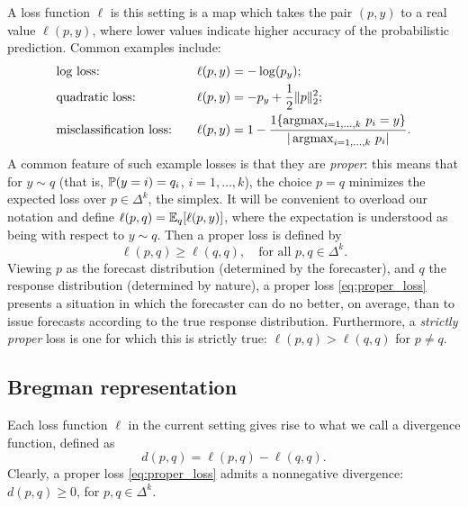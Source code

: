 A loss function $\ell$ is this setting is a map which takes the pair $(p,y)$ to
a real value $\ell(p,y)$, where lower values indicate higher accuracy of the 
probabilistic prediction. Common examples include: 
\begin{alignat*}{3}
&\text{log loss:} \quad &&\ell(p,y) = -\log(p_y); \\
&\text{quadratic loss:} \quad &&\ell(p,y) = -p_y + \frac{1}{2} \|p\|_2^2; \\
&\text{misclassification loss:} \quad &&\ell(p,y) = 1 - 
  \frac{1\{\argmax_{i=1,\dots,k} \, p_i = y \}}{|\argmax_{i=1,\dots,k} \, p_i|}.  
\end{alignat*}
A common feature of such example losses is that they are \emph{proper}:
this means that for $y \sim q$ (that is, $\P(y = i) = q_i$, $i=1,\dots,k$), 
the choice $p=q$ minimizes the expected loss over $p \in \Delta^k$, the
simplex. It will be convenient to overload our notation and define $\ell(p,q) = 
\E_q[\ell(p,y)]$, where the expectation is understood as being with respect to    
$y \sim q$. Then a proper loss is defined by 
\begin{equation}
\label{eq:proper_loss}
\ell(p,q) \geq \ell(q,q), \quad \text{for all $p,q \in \Delta^k$}. 
\end{equation}
Viewing $p$ as the forecast distribution (determined by the forecaster), and $q$
the response distribution (determined by nature), a proper loss
\eqref{eq:proper_loss} presents a situation in which the forecaster can do no
better, on average, than to issue forecasts according to the true response 
distribution. Furthermore, a \emph{strictly proper} loss is one for which this
is strictly true: $\ell(p,q) > \ell(q,q)$ for $p \not= q$.         


\subsection{Bregman representation}

Each loss function $\ell$ in the current setting gives rise to what we call a
divergence function, defined as
\[
d(p,q) = \ell(p,q) - \ell(q,q). 
\]
Clearly, a proper loss \eqref{eq:proper_loss} admits a nonnegative divergence:
$d(p,q) \geq 0$, for $p,q \in \Delta^k$.  

